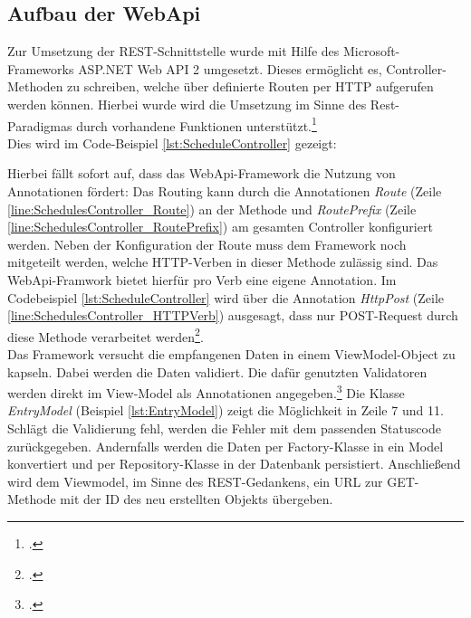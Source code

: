 \subsection{Aufbau der WebApi}
\label{ssec:aufbau-webapi}

Zur Umsetzung der REST-Schnittstelle wurde mit Hilfe des Microsoft-Frameworks \ac{ASP.NET Web API 2} umgesetzt. Dieses ermöglicht es, Controller-Methoden zu schreiben, welche über definierte Routen per HTTP aufgerufen werden können. Hierbei wurde wird die Umsetzung im Sinne des Rest-Paradigmas durch vorhandene Funktionen unterstützt.\footcite[S. 2ff.]{Building-a-REST-Service}\\
Dies wird im Code-Beispiel \ref{lst:ScheduleController} gezeigt:

Hierbei fällt sofort auf, dass das WebApi-Framework die Nutzung von Annotationen fördert: Das Routing kann durch die Annotationen \textit{Route} (Zeile \ref{line:SchedulesController_Route}) an der Methode und \textit{RoutePrefix} (Zeile \ref{line:SchedulesController_RoutePrefix}) am gesamten Controller konfiguriert werden. Neben der Konfiguration der Route muss dem Framework noch mitgeteilt werden, welche HTTP-Verben in dieser Methode zulässig sind. Das WebApi-Framwork bietet hierfür pro Verb eine eigene Annotation. Im Codebeispiel \ref{lst:ScheduleController} wird über die Annotation \textit{HttpPost} (Zeile \ref{line:SchedulesController_HTTPVerb}) ausgesagt, dass nur POST-Request durch diese Methode verarbeitet werden\footcite{webApi-AttributeRouting}. \\
Das Framework versucht die empfangenen Daten in einem ViewModel-Object zu kapseln. Dabei werden die Daten validiert. Die dafür genutzten Validatoren werden direkt im View-Model als Annotationen angegeben.\footcite{webApi-Validation} Die Klasse \textit{EntryModel} (Beispiel \ref{lst:EntryModel}) zeigt die Möglichkeit in Zeile 7 und 11. \\ 
Schlägt die Validierung fehl, werden die Fehler mit dem passenden Statuscode zurückgegeben. Andernfalls werden die Daten per \ac{Factory}-Klasse in ein Model konvertiert und per \ac{Repository}-Klasse in der Datenbank persistiert. Anschließend wird dem Viewmodel, im Sinne des REST-Gedankens, ein URL zur GET-Methode mit der ID des neu erstellten Objekts übergeben. 


